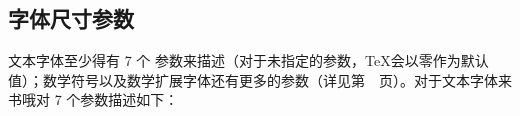 \documentclass{book}
\begin{document}
\subsection{字体尺寸参数}
\label{font:dims}

文本字体至少得有 7 个  参数来描述（对于未指定的参数，\TeX 会以零作为默认值）；数学符号以及数学扩展字体还有更多的参数（详见第~\pageref{fam23:fontdims}~页）。对于文本字体来书哦对 7 个参数描述如下：
\end{document}
